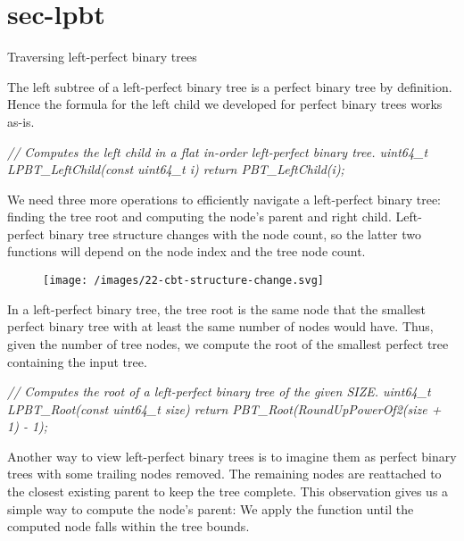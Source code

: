 \documentclass{article}
\begin{document}
\section{sec-lpbt}{Traversing left-perfect binary trees}

The left subtree of a left-perfect binary tree is a perfect binary tree by definition.
Hence the formula for the left child we developed for perfect binary trees works as-is.

\begin{code}[c]
\em{// Computes the left child in a flat in-order left-perfect binary tree.}
uint64_t LPBT_LeftChild(const uint64_t i) { return PBT_LeftChild(i); }
\end{code}

We need three more operations to efficiently navigate a left-perfect binary tree: finding the tree root and computing the node's parent and right child.
Left-perfect binary tree structure changes with the node count, so the latter two functions will depend on the node index and the tree node count.

\begin{figure}[grayscale-diagram]
  \texttt{[image: /images/22-cbt-structure-change.svg]}
\end{figure}

In a left-perfect binary tree, the tree root is the same node that the smallest perfect binary tree with at least the same number of nodes would have.
Thus, given the number of tree nodes, we compute the root of the smallest perfect tree containing the input tree.

\begin{code}[c]
\em{// Computes the root of a left-perfect binary tree of the given SIZE.}
uint64_t LPBT_Root(const uint64_t size) {
    return PBT_Root(RoundUpPowerOf2(size + 1) - 1);
}
\end{code}

Another way to view left-perfect binary trees is to imagine them as perfect binary trees with some trailing nodes removed.
The remaining nodes are reattached to the closest existing parent to keep the tree complete.
This observation gives us a simple way to compute the node's parent:
We apply the  function until the computed node falls within the tree bounds.
\end{document}

